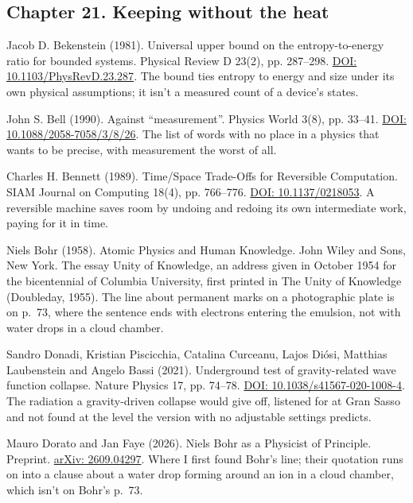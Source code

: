 \documentclass[11pt,twoside]{article}
\theoremstyle{thielethm}
\theoremstyle{thieledef}
\theoremstyle{thieledef}
\theoremstyle{thieledef}
\theoremstyle{thielethm}
\theoremstyle{thieleobs}
\theoremstyle{thielethm}
\begin{document}
\subsection*{Chapter 21. Keeping without the heat}

\noindent Jacob D. Bekenstein (1981). Universal upper bound on the entropy-to-energy ratio for bounded systems. Physical Review D 23(2), pp. 287--298. \href{https://doi.org/10.1103/PhysRevD.23.287}{DOI: 10.1103/PhysRevD.23.287}. The bound ties entropy to energy and size under its own physical assumptions; it isn't a measured count of a device's states.
\par\medskip

\noindent John S. Bell (1990). Against ``measurement''. Physics World 3(8), pp. 33--41. \href{https://doi.org/10.1088/2058-7058/3/8/26}{DOI: 10.1088/2058-7058/3/8/26}. The list of words with no place in a physics that wants to be precise, with measurement the worst of all.
\par\medskip

\noindent Charles H. Bennett (1989). Time/Space Trade-Offs for Reversible Computation. SIAM Journal on Computing 18(4), pp. 766--776. \href{https://doi.org/10.1137/0218053}{DOI: 10.1137/0218053}. A reversible machine saves room by undoing and redoing its own intermediate work, paying for it in time.
\par\medskip

\noindent Niels Bohr (1958). Atomic Physics and Human Knowledge. John Wiley and Sons, New York. The essay Unity of Knowledge, an address given in October 1954 for the bicentennial of Columbia University, first printed in The Unity of Knowledge (Doubleday, 1955). The line about permanent marks on a photographic plate is on p.~73, where the sentence ends with electrons entering the emulsion, not with water drops in a cloud chamber.
\par\medskip

\noindent Sandro Donadi, Kristian Piscicchia, Catalina Curceanu, Lajos Di\'osi, Matthias Laubenstein and Angelo Bassi (2021). Underground test of gravity-related wave function collapse. Nature Physics 17, pp. 74--78. \href{https://doi.org/10.1038/s41567-020-1008-4}{DOI: 10.1038/s41567-020-1008-4}. The radiation a gravity-driven collapse would give off, listened for at Gran Sasso and not found at the level the version with no adjustable settings predicts.
\par\medskip

\noindent Mauro Dorato and Jan Faye (2026). Niels Bohr as a Physicist of Principle. Preprint. \href{https://arxiv.org/abs/2609.04297}{arXiv: 2609.04297}. Where I first found Bohr's line; their quotation runs on into a clause about a water drop forming around an ion in a cloud chamber, which isn't on Bohr's p.~73.
\par\medskip
\end{document}
